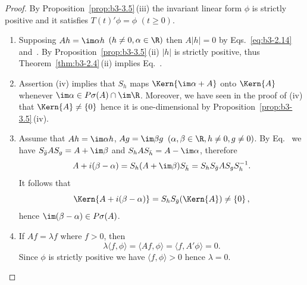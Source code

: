 \begin{proof}
	By Proposition~\ref{prop:b3-3.5}\,(iii) the invariant linear form $\phi$ is strictly positive and it satisfies $T(t)'\phi = \phi$ $(t \geq 0)$.
	\begin{enumerate}[wide, labelindent=.25em]
	\item[(iv)] 
	Supposing $Ah = \im\alpha h$ $(h \neq 0, \alpha \in \R)$ then $A|h| = 0$ by Eqs.~\eqref{eq:b3-2.14} and~.
	By Proposition~\ref{prop:b3-3.5}\,(ii) $|h|$ is strictly positive, thus Theorem~\ref{thm:b3-2.4}\,(ii) implies Eq.~.
	
	\item[(ii)] 
	Assertion (iv) implies that $S_{h}$ maps $\Kern{\im\alpha + A}$ onto $\Kern{A}$ whenever $\im \alpha \in P\sigma(A)\cap \im\R$.
	Moreover, we have seen in the proof of (iv) that $\Kern{A} \neq \{0\}$ hence it is one-dimensional by Proposition~\ref{prop:b3-3.5}\,(iv).
	
	\item[(i)] 
	Assume that $Ah = \im\alpha h$, $Ag = \im\beta g$ $(\alpha,\beta \in \R, h \neq 0, g \neq 0)$.
	By Eq.~ we have $S_{\bar{g}}A S_{g} = A + \im\beta$ and $S_{h}A S_{\bar{h}} = A - \im\alpha$, therefore
	\begin{equation}\label{eq:b3-3.6}
	A + i(\beta - \alpha) = S_{h}(A + \im\beta)S_{\bar{h}} = S_{h}S_{\bar{g}}A S_{g}S_{h}^{-1}.
	\end{equation}
	It follows that 
    \[%
    \Kern{A + i(\beta - \alpha)} = S_{h}S_{\bar{g}}(\Kern{A}) \neq \{0\}\,,
    \]
    hence $\im (\beta - \alpha) \in P\sigma(A)$.
	
	\item[(v)] 
	If\/ $Af = \lambda f$ where $f > 0$, then
	\begin{equation}\label{eq:b3-3.7}
	\lambda\langle f,\phi\rangle = \langle Af,\phi\rangle = \langle f,A'\phi\rangle = 0.
	\end{equation}
	Since $\phi$ is strictly positive we have $\langle f,\phi\rangle > 0$ hence $\lambda = 0$.
	

\end{enumerate}
\end{proof}
